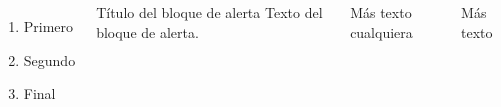 \begin{frame}
    \begin{columns}
        \begin{enumerate}
            \item Primero
            \item Segundo
            \item Final
        \end{enumerate}    
        \begin{alertblock}{Título del bloque de alerta}
            Texto del bloque de alerta.
        \end{alertblock}
    
        \begin{postitbox}
            Más texto cualquiera
        \end{postitbox}
    
        \begin{postitbox}[3cm]
            Más texto
        \end{postitbox}
    \end{columns}
\end{frame}





